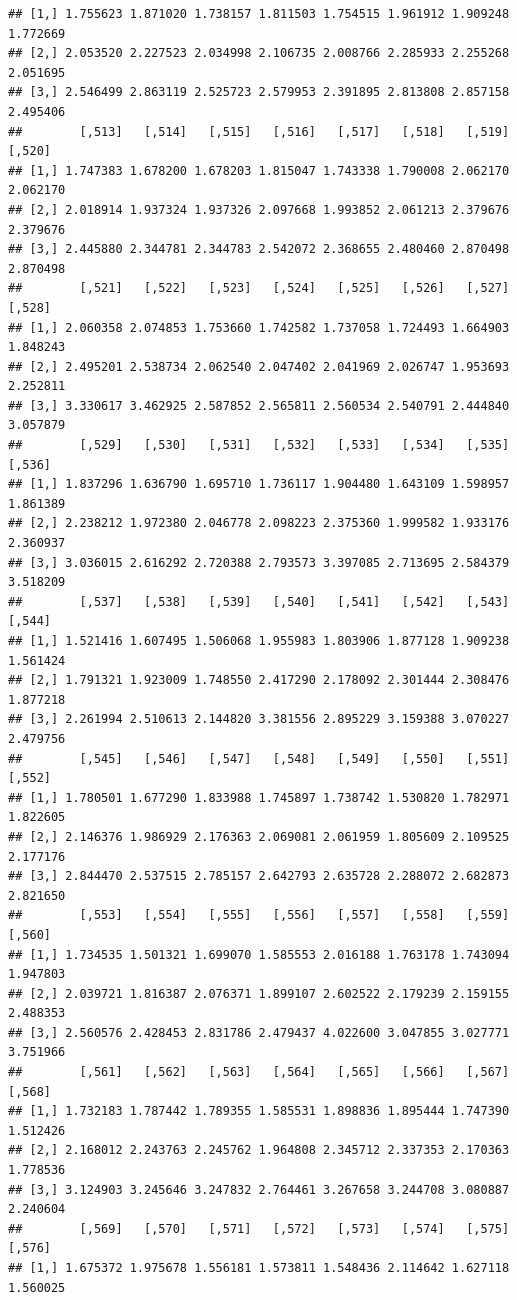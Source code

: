 \documentclass[article]{jss}\usepackage[]{graphicx}\usepackage[]{xcolor}
\makeatletter
\newenvironment{kframe}{%
 \def\at@end@of@kframe{}%
 \ifinner\ifhmode%
  \def\at@end@of@kframe{\end{minipage}}%
  \begin{minipage}{\columnwidth}%
 \fi\fi%
 \def\FrameCommand##1{\hskip\@totalleftmargin \hskip-\fboxsep
 \colorbox{shadecolor}{##1}\hskip-\fboxsep
     \hskip-\linewidth \hskip-\@totalleftmargin \hskip\columnwidth}%
 \MakeFramed {\advance\hsize-\width
   \@totalleftmargin\z@ \linewidth\hsize
   \@setminipage}}%
 {\par\unskip\endMakeFramed%
 \at@end@of@kframe}
\newenvironment{knitrout}{}{} %
\makeatother
\begin{document}
\begin{knitrout}
\begin{kframe}
\begin{verbatim}
## [1,] 1.755623 1.871020 1.738157 1.811503 1.754515 1.961912 1.909248 1.772669
## [2,] 2.053520 2.227523 2.034998 2.106735 2.008766 2.285933 2.255268 2.051695
## [3,] 2.546499 2.863119 2.525723 2.579953 2.391895 2.813808 2.857158 2.495406
##        [,513]   [,514]   [,515]   [,516]   [,517]   [,518]   [,519]   [,520]
## [1,] 1.747383 1.678200 1.678203 1.815047 1.743338 1.790008 2.062170 2.062170
## [2,] 2.018914 1.937324 1.937326 2.097668 1.993852 2.061213 2.379676 2.379676
## [3,] 2.445880 2.344781 2.344783 2.542072 2.368655 2.480460 2.870498 2.870498
##        [,521]   [,522]   [,523]   [,524]   [,525]   [,526]   [,527]   [,528]
## [1,] 2.060358 2.074853 1.753660 1.742582 1.737058 1.724493 1.664903 1.848243
## [2,] 2.495201 2.538734 2.062540 2.047402 2.041969 2.026747 1.953693 2.252811
## [3,] 3.330617 3.462925 2.587852 2.565811 2.560534 2.540791 2.444840 3.057879
##        [,529]   [,530]   [,531]   [,532]   [,533]   [,534]   [,535]   [,536]
## [1,] 1.837296 1.636790 1.695710 1.736117 1.904480 1.643109 1.598957 1.861389
## [2,] 2.238212 1.972380 2.046778 2.098223 2.375360 1.999582 1.933176 2.360937
## [3,] 3.036015 2.616292 2.720388 2.793573 3.397085 2.713695 2.584379 3.518209
##        [,537]   [,538]   [,539]   [,540]   [,541]   [,542]   [,543]   [,544]
## [1,] 1.521416 1.607495 1.506068 1.955983 1.803906 1.877128 1.909238 1.561424
## [2,] 1.791321 1.923009 1.748550 2.417290 2.178092 2.301444 2.308476 1.877218
## [3,] 2.261994 2.510613 2.144820 3.381556 2.895229 3.159388 3.070227 2.479756
##        [,545]   [,546]   [,547]   [,548]   [,549]   [,550]   [,551]   [,552]
## [1,] 1.780501 1.677290 1.833988 1.745897 1.738742 1.530820 1.782971 1.822605
## [2,] 2.146376 1.986929 2.176363 2.069081 2.061959 1.805609 2.109525 2.177176
## [3,] 2.844470 2.537515 2.785157 2.642793 2.635728 2.288072 2.682873 2.821650
##        [,553]   [,554]   [,555]   [,556]   [,557]   [,558]   [,559]   [,560]
## [1,] 1.734535 1.501321 1.699070 1.585553 2.016188 1.763178 1.743094 1.947803
## [2,] 2.039721 1.816387 2.076371 1.899107 2.602522 2.179239 2.159155 2.488353
## [3,] 2.560576 2.428453 2.831786 2.479437 4.022600 3.047855 3.027771 3.751966
##        [,561]   [,562]   [,563]   [,564]   [,565]   [,566]   [,567]   [,568]
## [1,] 1.732183 1.787442 1.789355 1.585531 1.898836 1.895444 1.747390 1.512426
## [2,] 2.168012 2.243763 2.245762 1.964808 2.345712 2.337353 2.170363 1.778536
## [3,] 3.124903 3.245646 3.247832 2.764461 3.267658 3.244708 3.080887 2.240604
##        [,569]   [,570]   [,571]   [,572]   [,573]   [,574]   [,575]   [,576]
## [1,] 1.675372 1.975678 1.556181 1.573811 1.548436 2.114642 1.627118 1.560025

\end{verbatim}
\end{kframe}
\end{knitrout}
\end{document}
